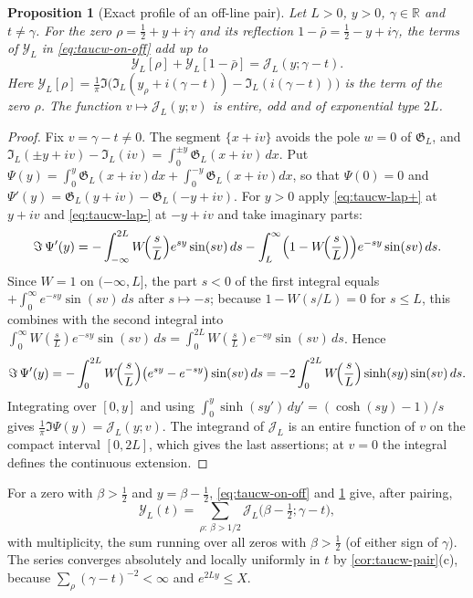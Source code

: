\documentclass[11pt,a4paper]{article}
\numberwithin{equation}{section}
\newtheorem{proposition}[theorem]{Proposition}
\theoremstyle{definition}
\theoremstyle{remark}
\begin{document}
\begin{proposition}[Exact profile of an off-line pair]\label{prop:taucw-pair}
Let $L>0$, $y>0$, $\gamma\in\mathbb R$ and $t\ne\gamma$. For the zero $\rho=\frac12+y+i\gamma$ and its reflection $1-\bar\rho=\frac12-y+i\gamma$, the terms of $\mathcal Y_L$ in \eqref{eq:taucw-on-off} add up to
\begin{equation}\label{eq:taucw-pair}
\mathcal Y_L[\rho]+\mathcal Y_L[1-\bar\rho]=\mathcal J_L(y;\gamma-t).
\end{equation}
Here $\mathcal Y_L[\rho]=\frac1\pi\Im\bigl(\mathfrak I_L(y_\rho+i(\gamma-t))-\mathfrak I_L(i(\gamma-t))\bigr)$ is the term of the zero $\rho$. The function $v\mapsto\mathcal J_L(y;v)$ is entire, odd and of exponential type $2L$.
\end{proposition}
\begin{proof}
Fix $v=\gamma-t\neq0$. The segment $\{x+iv\}$ avoids the pole $w=0$ of $\mathfrak G_L$, and $\mathfrak I_L(\pm y+iv)-\mathfrak I_L(iv)=\int_0^{\pm y}\mathfrak G_L(x+iv)\,dx$. Put $\Psi(y)=\int_0^{y}\mathfrak G_L(x+iv)dx+\int_0^{-y}\mathfrak G_L(x+iv)dx$, so that $\Psi(0)=0$ and $\Psi'(y)=\mathfrak G_L(y+iv)-\mathfrak G_L(-y+iv)$. For $y>0$ apply \eqref{eq:taucw-lap+} at $y+iv$ and \eqref{eq:taucw-lap-} at $-y+iv$ and take imaginary parts:
\begin{equation}
\Im\,\Psi'(y)=-\int_{-\infty}^{2L}W\!\Bigl(\frac sL\Bigr)e^{sy}\sin(sv)\,ds-\int_L^\infty\Bigl(1-W\!\Bigl(\frac sL\Bigr)\Bigr)e^{-sy}\sin(sv)\,ds .
\end{equation}
Since $W=1$ on $(-\infty,L]$, the part $s<0$ of the first integral equals $+\int_0^\infty e^{-sy}\sin(sv)\,ds$ after $s\mapsto-s$; because $1-W(s/L)=0$ for $s\le L$, this combines with the second integral into $\int_0^\infty W(\frac sL)e^{-sy}\sin(sv)\,ds=\int_0^{2L}W(\frac sL)e^{-sy}\sin(sv)\,ds$. Hence
\begin{equation}
\Im\,\Psi'(y)=-\int_0^{2L}W\!\Bigl(\frac sL\Bigr)\bigl(e^{sy}-e^{-sy}\bigr)\sin(sv)\,ds=-2\int_0^{2L}W\!\Bigl(\frac sL\Bigr)\sinh(sy)\sin(sv)\,ds .
\end{equation}
Integrating over $[0,y]$ and using $\int_0^y\sinh(sy')\,dy'=(\cosh(sy)-1)/s$ gives $\frac1\pi\Im\Psi(y)=\mathcal J_L(y;v)$. The integrand of $\mathcal J_L$ is an entire function of $v$ on the compact interval $[0,2L]$, which gives the last assertions; at $v=0$ the integral defines the continuous extension.
\end{proof}

For a zero with $\beta>\frac12$ and $y=\beta-\frac12$, \eqref{eq:taucw-on-off} and \cref{prop:taucw-pair} give, after pairing,
\begin{equation}\label{eq:taucw-Ypairs}
\mathcal Y_L(t)=\sum_{\rho:\ \beta>1/2}\mathcal J_L\bigl(\beta-\tfrac12;\gamma-t\bigr),
\end{equation}
with multiplicity, the sum running over all zeros with $\beta>\frac12$ (of either sign of $\gamma$). The series converges absolutely and locally uniformly in $t$ by \cref{cor:taucw-pair}(c), because $\sum_\rho(\gamma-t)^{-2}<\infty$ and $e^{2Ly}\le X$.
\end{document}
